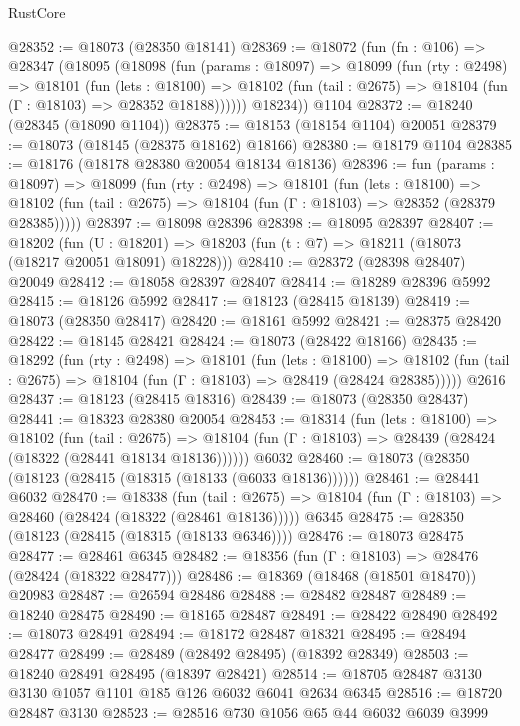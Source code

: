 \begin{lexlean}{RustCore}
\begin{coremodule}
@28352 := @18073 (@28350 @18141)
@28369 := @18072
    (fun (fn : @106) =>
    @28347
      (@18095
        (@18098
          (fun (params : @18097) =>
          @18099
            (fun (rty : @2498) =>
            @18101
              (fun (lets : @18100) =>
              @18102 (fun (tail : @2675) => @18104 (fun (Γ : @18103) => @28352 @18188))))))
        @18234))
    @1104
@28372 := @18240 (@28345 (@18090 @1104))
@28375 := @18153 (@18154 @1104) @20051
@28379 := @18073 (@18145 (@28375 @18162) @18166)
@28380 := @18179 @1104
@28385 := @18176 (@18178 @28380 @20054 @18134 @18136)
@28396 := fun (params : @18097) =>
  @18099
    (fun (rty : @2498) =>
    @18101
      (fun (lets : @18100) =>
      @18102 (fun (tail : @2675) => @18104 (fun (Γ : @18103) => @28352 (@28379 @28385)))))
@28397 := @18098 @28396
@28398 := @18095 @28397
@28407 := @18202
    (fun (U : @18201) => @18203 (fun (t : @7) => @18211 (@18073 (@18217 @20051 @18091) @18228)))
@28410 := @28372 (@28398 @28407) @20049
@28412 := @18058 @28397 @28407
@28414 := @18289 @28396 @5992
@28415 := @18126 @5992
@28417 := @18123 (@28415 @18139)
@28419 := @18073 (@28350 @28417)
@28420 := @18161 @5992
@28421 := @28375 @28420
@28422 := @18145 @28421
@28424 := @18073 (@28422 @18166)
@28435 := @18292
    (fun (rty : @2498) =>
    @18101
      (fun (lets : @18100) =>
      @18102 (fun (tail : @2675) => @18104 (fun (Γ : @18103) => @28419 (@28424 @28385)))))
    @2616
@28437 := @18123 (@28415 @18316)
@28439 := @18073 (@28350 @28437)
@28441 := @18323 @28380 @20054
@28453 := @18314
    (fun (lets : @18100) =>
    @18102
      (fun (tail : @2675) =>
      @18104 (fun (Γ : @18103) => @28439 (@28424 (@18322 (@28441 @18134 @18136))))))
    @6032
@28460 := @18073 (@28350 (@18123 (@28415 (@18315 (@18133 (@6033 @18136))))))
@28461 := @28441 @6032
@28470 := @18338
    (fun (tail : @2675) => @18104 (fun (Γ : @18103) => @28460 (@28424 (@18322 (@28461 @18136)))))
    @6345
@28475 := @28350 (@18123 (@28415 (@18315 (@18133 @6346))))
@28476 := @18073 @28475
@28477 := @28461 @6345
@28482 := @18356 (fun (Γ : @18103) => @28476 (@28424 (@18322 @28477)))
@28486 := @18369 (@18468 (@18501 @18470)) @20983
@28487 := @26594 @28486
@28488 := @28482 @28487
@28489 := @18240 @28475
@28490 := @18165 @28487
@28491 := @28422 @28490
@28492 := @18073 @28491
@28494 := @18172 @28487 @18321
@28495 := @28494 @28477
@28499 := @28489 (@28492 @28495) (@18392 @28349)
@28503 := @18240 @28491 @28495 (@18397 @28421)
@28514 := @18705 @28487 @3130 @3130 @1057 @1101 @185 @126 @6032 @6041 @2634 @6345
@28516 := @18720 @28487 @3130
@28523 := @28516 @730 @1056 @65 @44 @6032 @6039 @3999

\end{coremodule}
\end{lexlean}
